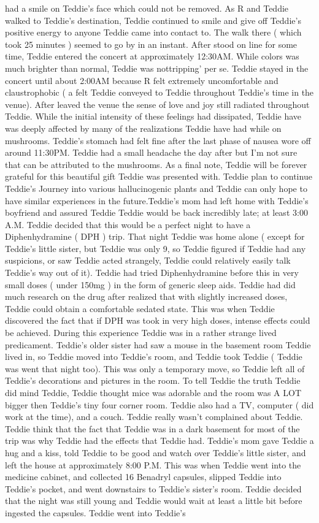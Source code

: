 \documentclass[12pt]{book}
\begin{document}
had a smile on Teddie's face which could not be removed. As R and Teddie walked to Teddie's destination, Teddie continued to smile and give off Teddie's positive energy to anyone Teddie came into contact to. The walk there ( which took 25 minutes ) seemed to go by in an instant. After stood on line for some time, Teddie entered the concert at approximately 12:30AM. While colors was much brighter than normal, Teddie was nottripping' per se. Teddie stayed in the concert until about 2:00AM because R felt extremely uncomfortable and claustrophobic ( a felt Teddie conveyed to Teddie throughout Teddie's time in the venue). After leaved the venue the sense of love and joy still radiated throughout Teddie. While the initial intensity of these feelings had dissipated, Teddie have was deeply affected by many of the realizations Teddie have had while on mushrooms. Teddie's stomach had felt fine after the last phase of nausea wore off around 11:30PM. Teddie had a small headache the day after but I'm not sure that can be attributed to the mushrooms. As a final note, Teddie will be forever grateful for this beautiful gift Teddie was presented with. Teddie plan to continue Teddie's Journey into various hallucinogenic plants and Teddie can only hope to have similar experiences in the future.Teddie's mom had left home with Teddie's boyfriend and assured Teddie Teddie would be back incredibly late; at least 3:00 A.M. Teddie decided that this would be a perfect night to have a Diphenhydramine ( DPH ) trip. That night Teddie was home alone ( except for Teddie's little sister, but Teddie was only 9, so Teddie figured if Teddie had any suspicions, or saw Teddie acted strangely, Teddie could relatively easily talk Teddie's way out of it). Teddie had tried Diphenhydramine before this in very small doses ( under 150mg ) in the form of generic sleep aids. Teddie had did much research on the drug after realized that with slightly increased doses, Teddie could obtain a comfortable sedated state. This was when Teddie discovered the fact that if DPH was took in very high doses, intense effects could be achieved. During this experience Teddie was in a rather strange lived predicament. Teddie's older sister had saw a mouse in the basement room Teddie lived in, so Teddie moved into Teddie's room, and Teddie took Teddie ( Teddie was went that night too). This was only a temporary move, so Teddie left all of Teddie's decorations and pictures in the room. To tell Teddie the truth Teddie did mind Teddie, Teddie thought mice was adorable and the room was A LOT bigger then Teddie's tiny four corner room. Teddie also had a TV, computer ( did work at the time), and a couch. Teddie really wasn't complained about Teddie. Teddie think that the fact that Teddie was in a dark basement for most of the trip was why Teddie had the effects that Teddie had. Teddie's mom gave Teddie a hug and a kiss, told Teddie to be good and watch over Teddie's little sister, and left the house at approximately 8:00 P.M. This was when Teddie went into the medicine cabinet, and collected 16 Benadryl capsules, slipped Teddie into Teddie's pocket, and went downstairs to Teddie's sister's room. Teddie decided that the night was still young and Teddie would wait at least a little bit before ingested the capsules. Teddie went into Teddie's 
\end{document}
